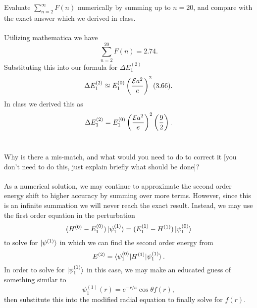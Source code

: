 \documentclass[10pt,letterpaper]{article}
\begin{document}
		Evaluate $\sum_{n=2}^{\infty} F(n)$ numerically by summing up to $n=20$, and compare with the exact answer
		which we derived in class.
		\\
		\\
		Utilizing mathematica we have
		\[
			\sum_{n=2}^{20} F(n) = 2.74.
		\]
		Substituting this into our formula for $\Delta E_1^{(2)}$
		\[
			\Delta E_1^{(2)} \approxeq E_1^{(0)}\left(\frac{\mathcal E a^2}{e}\right)^2(3.66).
		\]
		In class we derived this as 
		\[
			\Delta E_1^{(2)} = E_1^{(0)}\left(\frac{\mathcal E a^2}{e}\right)^2\left(\frac{9}{2}\right).
		\]
		\\
		 \item
		 Why is there a mis-match, and what would you need to do to correct it [you don't need to do this, just explain briefly what should 
		 be done]?
		 \\
		 \\
		 As a numerical solution, we may continue to approximate the second order energy shift to higher accuracy by summing over 
		 more terms. However, since this is an infinite summation we will never reach the exact result. Instead, we may use the first
		 order equation in the perturbation
		 \[
		 	(H^{(0)}-E^{(0)}_1)\ket{\psi^{(1)}_1} = (E^{(1)}_1-H^{(1)})\ket{\psi^{(0)}_1}
		\]
		to solve for $\ket{\psi^{(1)}}$ in which we can find the second order energy from
		\[
			E^{(2)} = \braket{\psi^{(0)}_1|H^{(1)}|\psi^{(1)}_1}.
		\]
		In order to solve for $\ket{\psi^{(1)}_1}$ in this case, we may make an educated guess of something similar to
		\[
			\psi^{(1)}_1(r) = e^{-r/a}\cos\theta f(r),
		\]
		then substitute this into the modified radial equation to finally solve for $f(r)$. 
		\eenum
\eenum
\end{document}

